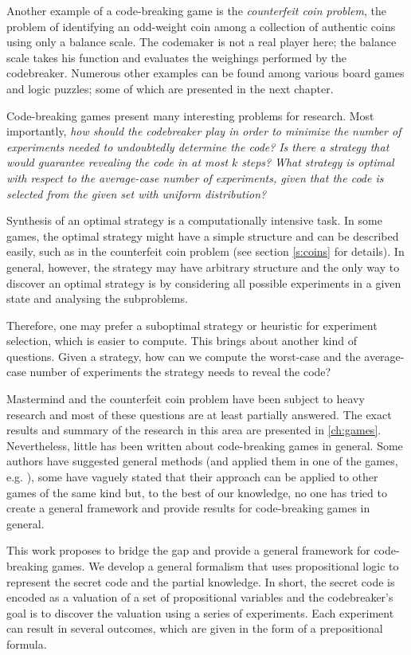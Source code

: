 Another example of a code-breaking game is the \emph{counterfeit coin problem},
  the problem of identifying an odd-weight coin among
  a collection of authentic coins using only a balance scale.
The codemaker is not a real player here; the balance scale takes his function
  and evaluates the weighings performed by the codebreaker.
Numerous other examples can be found among various board games and logic puzzles;
 some of which are presented in the next chapter.

Code-breaking games present many interesting problems for research.
Most importantly,
 \emph{how should the codebreaker play in order to minimize the number of experiments
   needed to undoubtedly determine the code?}
 \emph{Is there a strategy that would guarantee
   revealing the code in at most $k$ steps?}
 \emph{What strategy is optimal with respect
   to the average-case number of experiments,
   given that the code is selected
   from the given set with uniform distribution?}

Synthesis of an optimal strategy is a computationally intensive task.
In some games, the optimal strategy might have a simple
  structure and can be described easily, such as in
  the counterfeit coin problem (see section \autoref{s:coins} for details).
In general, however, the strategy may have arbitrary structure and the only way
  to discover an optimal strategy is by considering all possible experiments
  in a given state and analysing the subproblems.

Therefore, one may prefer a suboptimal strategy or heuristic
  for experiment selection,
  which is easier to compute.
This brings about another kind of questions.
Given a strategy,
  how can we compute the worst-case and the average-case number
  of experiments the strategy needs to reveal the code?

Mastermind and the counterfeit coin problem have been subject to
heavy research and most of these questions are at least partially answered.
The exact results and summary of the research in this area are presented
  in \autoref{ch:games}.
Nevertheless, little has been written about code-breaking games in general.
Some authors have suggested general methods (and applied them in one of the games,
  e.g. \cite{cbg-stgopt, cbg-gen}),
  some have vaguely stated that their approach can be applied
  to other games of the same kind but,
  to the best of our knowledge, no one has tried to
  create a general framework and provide
   results for code-breaking games in general.

This work proposes to bridge the gap and provide
  a general framework for code-breaking games.
We develop a general formalism that uses propositional logic to
  represent the secret code and the partial knowledge.
In short, the secret code is encoded as a valuation of
  a set of propositional variables
  and the codebreaker's goal is to discover the valuation
  using a series of experiments.
Each experiment can result in several outcomes,
  which are given in the form of a prepositional formula.

